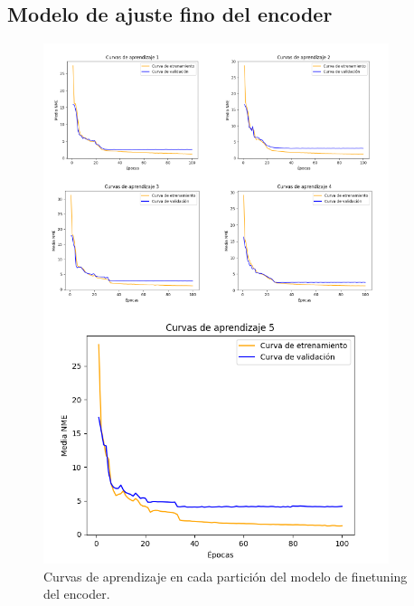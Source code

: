 \newpage
\subsection*{Modelo de ajuste fino del encoder}
\begin{figure}[H]
    \centering
    \includegraphics[width=0.9\textwidth]{img/curvas_encoder.png}
    \caption{Curvas de aprendizaje en cada partición del modelo de finetuning del encoder.}
    \label{fig:curvas_encoder}
\end{figure}

\newpage
